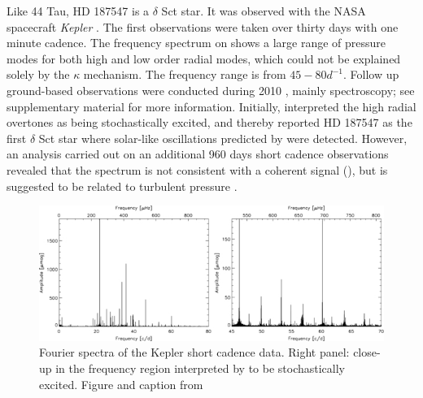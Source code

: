 Like 44 Tau, HD 187547 is a $\delta$ Sct star. It was observed  with the NASA spacecraft \textit{Kepler} \citep{koch2010kepler}. The first observations were taken over thirty days with one minute cadence. The frequency spectrum on  shows a large range of pressure modes for both high and low order radial modes, which could not be explained solely by the $\kappa$ mechanism. The frequency range is from $45-80 d^{-1}$. Follow up ground-based observations were conducted during 2010 \citep{antoci2011excitation}, mainly spectroscopy; see \citet{antoci2011excitation} supplementary material for more information. Initially, \citet{antoci2011excitation} interpreted the high radial overtones as being stochastically excited, and thereby reported HD 187547 as the first $\delta$ Sct star where solar-like oscillations predicted by \citet{houdek1999, samadi2002} were detected.  However, an analysis carried out on an additional 960 days short cadence observations revealed that the spectrum is not consistent with a coherent signal (), but is suggested to be related to turbulent pressure \citep{antoci2014role}. 

\begin{figure}[htbp]
    \centering
    \includegraphics[width=1\textwidth]{superstarspectrum.jpg}
    \caption{Fourier spectra of the Kepler short cadence data. Right panel: close-up in the frequency region interpreted by \citet{antoci2011solar} to be stochastically excited. Figure and caption from \citet{antoci2014role}}
    \label{ssspectrum}
\end{figure}

